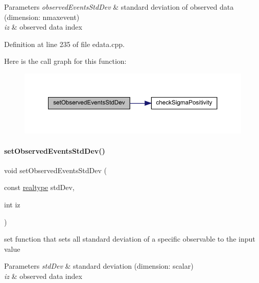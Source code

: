 \begin{DoxyParams}{Parameters}
{\em observed\+Events\+Std\+Dev} & standard deviation of observed data (dimension\+: nmaxevent) \\
\hline
{\em iz} & observed data index \\
\hline
\end{DoxyParams}


Definition at line 235 of file edata.\+cpp.

Here is the call graph for this function\+:
\nopagebreak
\begin{figure}[H]
\begin{center}
\leavevmode
\includegraphics[width=350pt]{classamici_1_1_exp_data_a9fe1de066fcba20ce994d9817442a826_cgraph}
\end{center}
\end{figure}
\mbox{\label{classamici_1_1_exp_data_a2533798d195c8ede07c783800adf1d82}} 
\paragraph{\texorpdfstring{set\+Observed\+Events\+Std\+Dev()}{setObservedEventsStdDev()}\hspace{0.1cm}{\footnotesize\ttfamily [4/4]}}
{\footnotesize\ttfamily void set\+Observed\+Events\+Std\+Dev (\begin{DoxyParamCaption}\item[{const \mbox{\hyperlink{namespaceamici_a1bdce28051d6a53868f7ccbf5f2c14a3}{realtype}}}]{std\+Dev,  }\item[{int}]{iz }\end{DoxyParamCaption})}

set function that sets all standard deviation of a specific observable to the input value


\begin{DoxyParams}{Parameters}
{\em std\+Dev} & standard deviation (dimension\+: scalar) \\
\hline
{\em iz} & observed data index \\
\hline
\end{DoxyParams}


